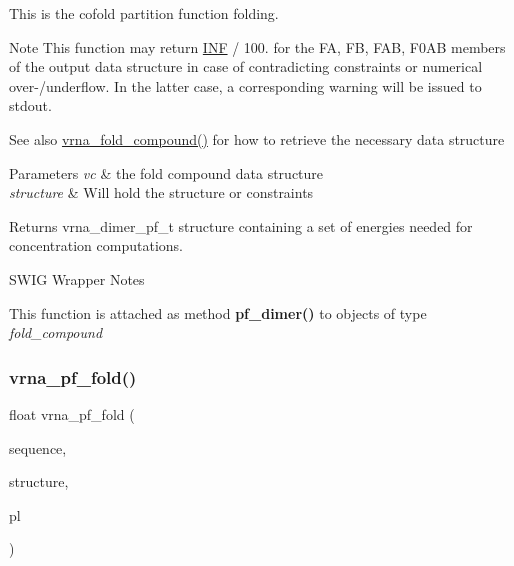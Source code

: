 This is the cofold partition function folding.

\begin{DoxyNote}{Note}
This function may return \mbox{\hyperlink{constants_8h_a12c2040f25d8e3a7b9e1c2024c618cb6}{I\+NF}} / 100. for the {\ttfamily FA}, {\ttfamily FB}, {\ttfamily F\+AB}, {\ttfamily F0\+AB} members of the output data structure in case of contradicting constraints or numerical over-\//underflow. In the latter case, a corresponding warning will be issued to {\ttfamily stdout}.
\end{DoxyNote}
\begin{DoxySeeAlso}{See also}
\mbox{\hyperlink{group__fold__compound_ga6601d994ba32b11511b36f68b08403be}{vrna\+\_\+fold\+\_\+compound()}} for how to retrieve the necessary data structure
\end{DoxySeeAlso}

\begin{DoxyParams}{Parameters}
{\em vc} & the fold compound data structure \\
\hline
{\em structure} & Will hold the structure or constraints \\
\hline
\end{DoxyParams}
\begin{DoxyReturn}{Returns}
vrna\+\_\+dimer\+\_\+pf\+\_\+t structure containing a set of energies needed for concentration computations.
\end{DoxyReturn}
\begin{DoxyRefDesc}{S\+W\+I\+G Wrapper Notes}
\item[\mbox{\hyperlink{wrappers__wrappers000110}{S\+W\+I\+G Wrapper Notes}}]This function is attached as method {\bfseries{pf\+\_\+dimer()}} to objects of type {\itshape fold\+\_\+compound} \end{DoxyRefDesc}
\mbox{\label{group__part__func__global_gac4a2a74a79e49818bc35412a2b392c7e}} 
\subsubsection{\texorpdfstring{vrna\_pf\_fold()}{vrna\_pf\_fold()}}
{\footnotesize\ttfamily float vrna\+\_\+pf\+\_\+fold (\begin{DoxyParamCaption}\item[{const char $\ast$}]{sequence,  }\item[{char $\ast$}]{structure,  }\item[{\mbox{\hyperlink{group__struct__utils__plist_gab9ac98ab55ded9fb90043b024b915aca}{vrna\+\_\+ep\+\_\+t}} $\ast$$\ast$}]{pl }\end{DoxyParamCaption})}



